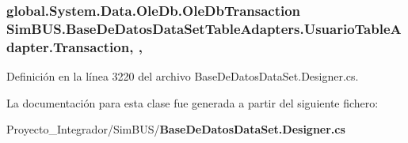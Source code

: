 \subsubsection[{Transaction}]{\setlength{\rightskip}{0pt plus 5cm}global.\-System.\-Data.\-Ole\-Db.\-Ole\-Db\-Transaction Sim\-B\-U\-S.\-Base\-De\-Datos\-Data\-Set\-Table\-Adapters.\-Usuario\-Table\-Adapter.\-Transaction\hspace{0.3cm}{\ttfamily [get]}, {\ttfamily [set]}, {\ttfamily [package]}}\label{class_sim_b_u_s_1_1_base_de_datos_data_set_table_adapters_1_1_usuario_table_adapter_a80abc093e54d92aa5440e191ce484929}


Definición en la línea 3220 del archivo Base\-De\-Datos\-Data\-Set.\-Designer.\-cs.



La documentación para esta clase fue generada a partir del siguiente fichero\-:\begin{DoxyCompactItemize}
\item 
Proyecto\-\_\-\-Integrador/\-Sim\-B\-U\-S/{\bf Base\-De\-Datos\-Data\-Set.\-Designer.\-cs}\end{DoxyCompactItemize}
